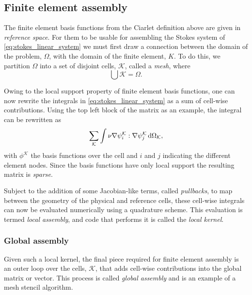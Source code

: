\documentclass[thesis]{subfiles}
\begin{document}

\subsection{Finite element assembly}

The finite element basis functions from the Ciarlet definition above are given in \emph{reference space}.
For them to be usable for assembling the Stokes system of \cref{eq:stokes_linear_system} we must first draw a connection between the domain of the problem, $\Omega$, with the domain of the finite element, $K$.
To do this, we partition $\Omega$ into a set of disjoint cells, $\mathcal{K}$, called a \emph{mesh}, where
\begin{equation}
  \bigcup \mathcal{K} = \Omega.
\end{equation}

Owing to the local support property of finite element basis functions, one can now rewrite the integrals in \cref{eq:stokes_linear_system} as a sum of cell-wise contributions.
Using the top left block of the matrix as an example, the integral can be rewritten as
\begin{equation}
  \sum_{\mathcal{K}} \int \nu \nabla \psi_i^{\mathcal{K}} : \nabla \psi_j^{\mathcal{K}} \, \textnormal{d}\Omega_{\mathcal{K}},
\end{equation}
with $\phi^{\mathcal{K}}$ the basis functions over the cell and $i$ and $j$ indicating the different element nodes.
Since the basis functions have only local support the resulting matrix is \emph{sparse}.

Subject to the addition of some Jacobian-like terms, called \emph{pullbacks}, to map between the geometry of the physical and reference cells, these cell-wise integrals can now be evaluated numerically using a quadrature scheme.
This evaluation is termed \emph{local assembly}, and code that performs it is called the \emph{local kernel}.

\subsubsection{Global assembly}

Given such a local kernel, the final piece required for finite element assembly is an outer loop over the cells, $\mathcal{K}$, that adds cell-wise contributions into the global matrix or vector.
This process is called \emph{global assembly} and is an example of a mesh stencil algorithm.
\end{document}
